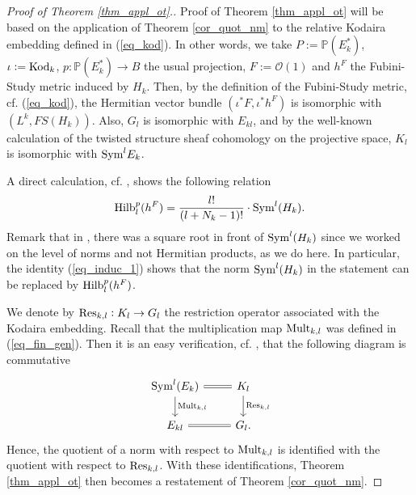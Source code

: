 \documentclass[12pt]{article}
\numberwithin{equation}{section}
\theoremstyle{theorem}
\theoremstyle{definition}
\theoremstyle{remark}
\newcommand{\res}{{\rm{Res}}}
\begin{document}
	\begin{proof}[Proof of Theorem \ref{thm_appl_ot}.]
		Proof of Theorem \ref{thm_appl_ot} will be based on the application of Theorem \ref{cor_quot_nm} to the relative Kodaira embedding defined in (\ref{eq_kod}).
		In other words, we take $P := \mathbb{P}(E_k^*)$, $\iota := {\rm{Kod}}_k$, $p : \mathbb{P}(E_k^*) \to B$ the usual projection, $F := \mathscr{O}(1)$ and $h^F$ the Fubini-Study metric induced by $H_k$. 
		Then, by the definition of the Fubini-Study metric, cf. (\ref{eq_kod}), the Hermitian vector bundle $(\iota^* F, \iota^* h^F)$ is isomorphic with $(L^k, FS(H_k))$.
		Also, $G_l$ is isomorphic with $E_{kl}$, and by the well-known calculation of the twisted structure sheaf cohomology on the projective space, $K_l$ is isomorphic with ${\rm{Sym}}^l E_k$.
		\par 
		A direct calculation, cf. \cite[Lemma 4.15]{FinTits}, shows the following relation
		\begin{equation}\label{eq_induc_1}
			{\rm{Hilb}}_l^p(h^F) = \frac{l!}{(l + N_k - 1)!} \cdot {\rm{Sym}}^l(H_k).
		\end{equation}
		Remark that in \cite[Lemma 4.15]{FinTits}, there was a square root in front of ${\rm{Sym}}^l(H_k)$ since we worked on the level of norms and not Hermitian products, as we do here.
		In particular, the identity (\ref{eq_induc_1}) shows that the norm ${\rm{Sym}}^l(H_k)$ in the statement can be replaced by ${\rm{Hilb}}_l^p(h^F)$.
		\par 
		We denote by $\res_{k, l}:K_l \to G_l$ the restriction operator associated with the Kodaira embedding.
		Recall that the multiplication map ${\rm{Mult}}_{k, l}$ was defined in (\ref{eq_fin_gen}).
		Then it is an easy verification, cf. \cite[(4.62)]{FinSecRing}, that the following diagram is commutative 
		\begin{equation}\label{eq_kod_res}
		\begin{tikzcd}
			{\rm{Sym}}^l(E_k) \arrow[equal]{r} \arrow{d}{{\rm{Mult}}_{k, l}} & K_l \arrow{d}{\res_{k, l}} \\
 			E_{kl} \arrow[equal]{r} & G_l.
		\end{tikzcd}
		\end{equation}
		Hence, the quotient of a norm with respect to ${\rm{Mult}}_{k, l}$ is identified with the quotient with respect to $\res_{k, l}$. 
		With these identifications, Theorem \ref{thm_appl_ot} then becomes a restatement of Theorem \ref{cor_quot_nm}.
	\end{proof}
\end{document}
